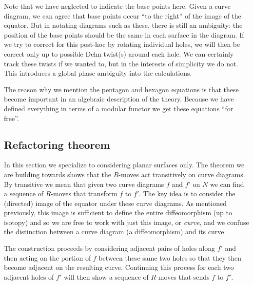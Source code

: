 \documentclass[aps, tightenlines, letterpaper, onecolumn, superscriptaddress, notitlepage, 11pt, groupedaddress]{revtex4-1}
\begin{document}
Note that we have neglected to indicate the base points here.
Given a curve diagram, we can agree that base points
occur ``to the right'' of the image of the equator.
But in notating diagrams such as these, there is still
an ambiguity: the position of the base points should be the
same in each surface in the diagram.
If we try to correct for this post-hoc
by rotating individual holes,
we will then be correct
only up to possible Dehn twist(s) around each hole.
We can certainly track these twists if we wanted to,
but in the interests of simplicity we do not.
This introduces a global phase ambiguity into the
calculations.


The reason why we mention the pentagon and hexagon
equations is that these become important in an
algebraic description of the theory.
Because we have defined everything in terms of
a modular functor we get these equations ``for free''.



%
%

\subsection{Refactoring theorem}
In this section we specialize to considering planar surfaces only.
The theorem we are building towards shows that
the $R$-moves act transitively
on curve diagrams.
By transitive we mean that
given two curve diagrams $f$ and $f'$ on $N$ we can find
a sequence of $R$-moves that transform $f$ to $f'.$
The key idea is to consider the (directed) image of the equator under
these curve diagrams.
As mentioned previously, this image is sufficient to
define the entire diffeomorphism (up to isotopy) and so we are free
to work with just this image, or \emph{curve},
and we confuse the distinction between 
a curve diagram (a diffeomorphism)
and its curve.

The construction proceeds by considering adjacent
pairs of holes along $f'$ and then acting on the
portion of $f$ between these same two holes so that
they then become adjacent on the resulting curve.
Continuing this
process for each two adjacent holes of $f'$ will then
show a sequence of $R$-moves that sends $f$ to $f'.$
\end{document}

